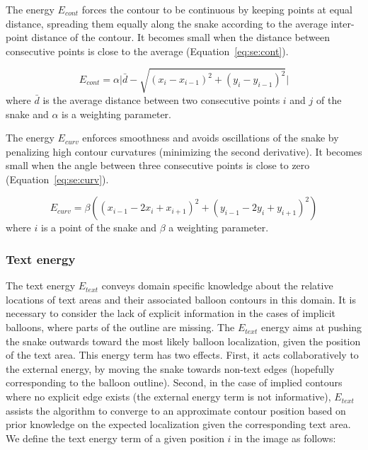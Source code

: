 The energy $E_{cont}$ forces the contour to be continuous by keeping points at equal distance, spreading them equally along the snake according to the average inter-point distance of the contour.
It becomes small when the distance between consecutive points is close to the average (Equation~\ref{eq:se:cont}).

\begin{equation}\label{eq:se:cont}
 E_{cont} = \alpha \Big|\bar{d} - \sqrt{(x_i - x_{i-1} )^2 + (y_i - y_{i-1} )^2}\Big|
\end{equation}
where $\bar{d}$ is the average distance between two consecutive points $i$ and $j$ of the snake and $\alpha$ is a weighting parameter.

The energy $E_{curv}$ enforces smoothness and avoids oscillations of the snake by penalizing high contour curvatures (minimizing the second derivative).
It becomes small when the angle between three consecutive points is close to zero (Equation~\ref{eq:se:curv}).

\begin{equation}\label{eq:se:curv}
  E_{curv} = \beta \left( (x_{i-1} - 2x_{i} + x_{i+1})^2 + (y_{i-1} - 2y_{i} + y_{i+1})^2 \right)
\end{equation}
where $i$ is a point of the snake and $\beta$ a weighting parameter.


\subsubsection{Text energy}
\label{sec:se:text_energie}

The text energy $E_{text}$ conveys domain specific knowledge about the relative locations of text areas and their associated balloon contours in this domain.
It is necessary to consider the lack of explicit information in the cases of implicit balloons, where parts of the outline are missing.
The $E_{text}$ energy aims at pushing the snake outwards toward the most likely balloon localization, given the position of the text area.
This energy term has two effects.
First, it acts collaboratively to the external energy, by moving the snake towards non-text edges (hopefully corresponding to the balloon outline).
Second, in the case of implied contours where no explicit edge exists (the external energy term is not informative), $E_{text}$ assists the algorithm to converge to an approximate contour position based on prior knowledge on the expected localization given the corresponding text area.
We define the text energy term of a given position $i$ in the image as follows:

